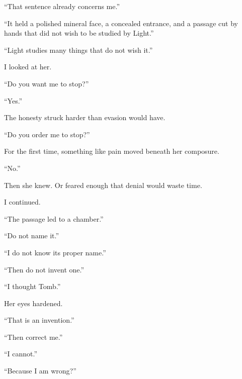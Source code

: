 ``That sentence already concerns me.''\par

``It held a polished mineral face, a concealed entrance, and a passage cut by hands that did not wish to be studied by Light.''\par

``Light studies many things that do not wish it.''\par

I looked at her.\par

``Do you want me to stop?''\par

``Yes.''\par

The honesty struck harder than evasion would have.\par

``Do you order me to stop?''\par

For the first time, something like pain moved beneath her composure.\par

``No.''\par

Then she knew. Or feared enough that denial would waste time.\par

I continued.\par

``The passage led to a chamber.''\par

``Do not name it.''\par

``I do not know its proper name.''\par

``Then do not invent one.''\par

``I thought Tomb.''\par

Her eyes hardened.\par

``That is an invention.''\par

``Then correct me.''\par

``I cannot.''\par

``Because I am wrong?''\par


